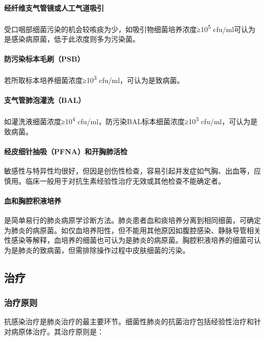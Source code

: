 \paragraph{经纤维支气管镜或人工气道吸引}

受口咽部细菌污染的机会较咳痰为少，如吸引物细菌培养浓度≥10\textsuperscript{5}
cfu/ml可认为是感染病原菌，低于此浓度则多为污染菌。

\paragraph{防污染标本毛刷（PSB）}

若所取标本培养细菌浓度≥10\textsuperscript{3} cfu/ml，可认为是致病菌。

\paragraph{支气管肺泡灌洗（BAL）}

如灌洗液细菌浓度≥10\textsuperscript{4}
cfu/ml，防污染BAL标本细菌浓度≥10\textsuperscript{3}
cfu/ml，可认为是致病菌。

\paragraph{经皮细针抽吸（PFNA）和开胸肺活检}

敏感性与特异性均很好，但因是创伤性检查，容易引起并发症如气胸、出血等，应慎用。临床一般用于对抗生素经验性治疗无效或其他检查不能确定者。

\paragraph{血和胸腔积液培养}

是简单易行的肺炎病原学诊断方法。肺炎患者血和痰培养分离到相同细菌，可确定为肺炎的病原菌。如仅血培养阳性，但不能用其他原因如腹腔感染、静脉导管相关性感染等解释，血培养的细菌也可认为是肺炎的病原菌。胸腔积液培养的细菌可认为是肺炎的致病菌，但需排除操作过程中皮肤细菌的污染。

\subsection{治疗}

\subsubsection{治疗原则}

抗感染治疗是肺炎治疗的最主要环节。细菌性肺炎的抗菌治疗包括经验性治疗和针对病原体治疗。其治疗原则是：

